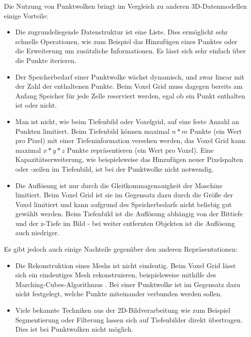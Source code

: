 Die Nutzung von Punktwolken bringt im Vergleich zu anderen 3D-Datenmodellen einige Vorteile:

\begin{itemize}
\item Die zugrundeliegende Datenstruktur ist eine Liste.
Dies ermöglicht sehr schnelle Operationen, wie zum Beispiel das Hinzufügen eines Punktes oder die Erweiterung um zusätzliche Informationen.
Es lässt sich sehr einfach über die Punkte iterieren.
\item Der Speicherbedarf einer Punktwolke wächst dynamisch, und zwar linear mit der Zahl der enthaltenen Punkte.
Beim Voxel Grid muss dagegen bereits am Anfang Speicher für jede Zelle reserviert werden, egal ob ein Punkt enthalten ist oder nicht.
\item Man ist nicht, wie beim Tiefenbild oder Voxelgrid, auf eine feste Anzahl an Punkten limitiert.
Beim Tiefenbild können maximal $n * m$ Punkte (ein Wert pro Pixel) mit einer Tiefeninformation versehen werden, das Voxel Grid kann maximal $x * y * z$ Punkte repräsentieren (ein Wert pro Voxel).
Eine Kapazitätserweiterung, wie beispielsweise das Hinzufügen neuer Pixelspalten oder -zeilen im Tiefenbild, ist bei der Punktwolke nicht notwendig.
\item Die Auflösung ist nur durch die Gleitkommagenauigkeit der Maschine limitiert.
Beim Voxel Grid ist sie im Gegensatz dazu durch die Größe der Voxel limitiert und kann aufgrund des Speicherbedarfs nicht beliebig gut gewählt werden.
Beim Tiefenbild ist die Auflösung abhängig von der Bittiefe und der z-Tiefe im Bild - bei weiter entfernten Objekten ist die Auflösung auch niedriger.
\end{itemize}

Es gibt jedoch auch einige Nachteile gegenüber den anderen Repräsentationen:

\begin{itemize}
\item Die Rekonstruktion eines Meshs ist nicht eindeutig.
Beim Voxel Grid lässt sich ein eindeutiges Mesh rekonstruieren, beispielsweise mithilfe des Marching-Cubes-Algorithmus \cite{lorensen1987marching}.
Bei einer Punktwolke ist im Gegensatz dazu nicht festgelegt, welche Punkte miteinander verbunden werden sollen.
\item Viele bekannte Techniken aus der 2D-Bildverarbeitung wie zum Beispiel Segmentierung oder Filterung lassen sich auf Tiefenbilder direkt übertragen.
Dies ist bei Punktwolken nicht möglich.
\end{itemize}


